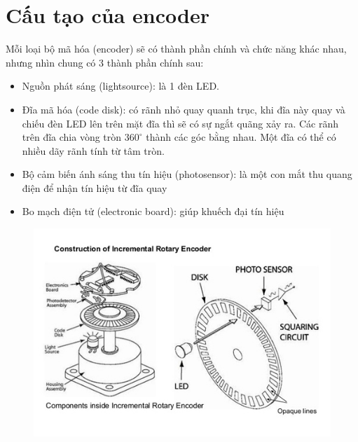     \section{Cấu tạo của encoder}
        Mỗi loại bộ mã hóa (encoder) sẽ có thành phần chính và chức năng khác nhau, nhưng nhìn chung có 3 thành phần chính sau:
        \begin{itemize}
            \item Nguồn phát sáng (lightsource): là 1 đèn LED.
            \item Đĩa mã hóa (code disk): có rãnh nhỏ quay quanh trục, khi đĩa này quay và chiếu đèn LED lên trên mặt đĩa thì sẽ có sự ngắt quãng xảy ra. Các rãnh trên đĩa chia vòng tròn $360^{\circ}$ thành các góc bằng nhau. Một đĩa có thể có nhiều dãy rãnh tính từ tâm tròn.
            \item Bộ cảm biến ánh sáng thu tín hiệu (photosensor): là một con mắt thu quang điện để nhận tín hiệu từ đĩa quay
            \item  Bo mạch điện tử (electronic board): giúp khuếch đại tín hiệu
        \end{itemize}
        \begin{figure}[H]
                \centering
                \includegraphics[width=1\linewidth]{pictures/encoder5.png}
            \end{figure}
        
        
        \cleardoublepage
